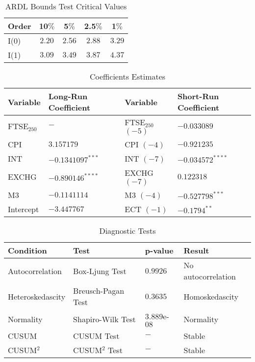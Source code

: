 \documentclass[11pt,a4paper]{article}
\begin{document}
\begin{table}[h!]
    \centering
    \caption{ARDL Bounds Test Critical Values}
    \begin{tabular}{lcccc}
        \toprule
        \textbf{Order} & \textbf{10$\%$} & \textbf{5$\%$} & \textbf{2.5$\%$} & \textbf{1$\%$} \\
        \midrule
        I(0) & $2.20$ & $2.56$ & $2.88$ & $3.29$ \\
        I(1) & $3.09$ & $3.49$ & $3.87$  & $4.37$ \\
        \bottomrule
    \end{tabular}
\end{table}

\begin{table}[h!]
    \centering
    \caption{Coefficients Estimates}
    \begin{tabular}{llll}
        \toprule
        \textbf{Variable} & \textbf{Long-Run Coefficient} & \textbf{Variable} & \textbf{Short-Run Coefficient} \\
        \midrule
        FTSE$_{250}$ & $-$ & FTSE$_{250}$ $(-5)$  & $-0.033089$ \\
        CPI & $3.157179$ & CPI $(-4)$ & $-0.921235$ \\
        INT & $-0.1341097^{***}$ & INT $(-7)$ & $-0.034572^{****}$\\
        EXCHG &  $-0.890146^{****}$ & EXCHG $(-7)$ & $0.122318$ \\
        M3 & $-0.1141114$ & M3 $(-4)$ & $-0.527798^{***}$ \\
        Intercept & $-3.447767$ & ECT $(-1)$ & $-0.1794^{**}$ \\
        \bottomrule
    \end{tabular}
\end{table}

\begin{table}[h!]
    \centering
    \caption{Diagnostic Tests}
    \begin{tabular}{llll}
        \toprule
        \textbf{Condition} & \textbf{Test} & \textbf{p-value} & \textbf{Result} \\
        \midrule
        Autocorrelation & Box-Ljung Test & $0.9926$ & No autocorrelation \\
        Heteroskedascity & Breusch-Pagan Test & $0.3635$ & Homoskedascity \\
        Normality & Shapiro-Wilk Test & $3.889$e-$08$ & Normality \\
        CUSUM & CUSUM Test & $-$ & Stable \\
        CUSUM$^2$ & CUSUM$^2$ Test & $-$ & Stable \\
        \bottomrule
    \end{tabular}
\end{table}
\end{document}
